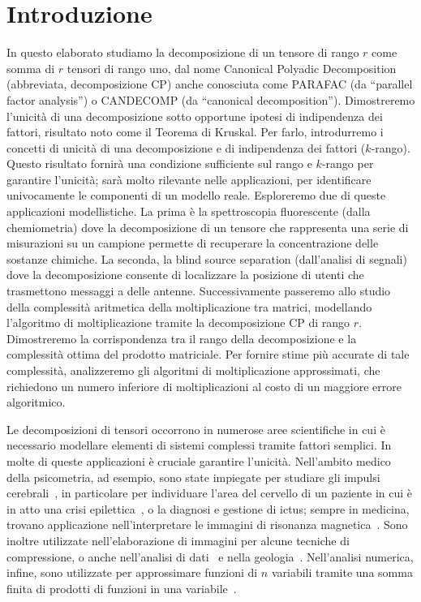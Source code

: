 
\chapter*{Introduzione}

In questo elaborato studiamo la decomposizione di un tensore di rango $ r $ come somma di $ r $ tensori di rango uno, dal
nome Canonical Polyadic Decomposition (abbreviata, decomposizione CP) anche conosciuta come PARAFAC (da ``parallel factor
analysis'') o CANDECOMP (da ``canonical decomposition'').
Dimostreremo l'unicità di una decomposizione sotto opportune ipotesi di indipendenza dei fattori, risultato noto come il Teorema
di Kruskal. Per farlo, introdurremo i concetti di unicità di una decomposizione e di indipendenza
dei fattori ($ k $-rango). Questo
risultato fornirà una condizione sufficiente sul rango e $k$-rango per garantire l'unicità; sarà molto rilevante nelle applicazioni, per identificare univocamente le componenti di un
modello reale. Esploreremo due di queste applicazioni modellistiche. La prima è la spettroscopia fluorescente (dalla
chemiometria) dove la decomposizione di un tensore che rappresenta una serie di misurazioni su un
campione permette di recuperare la concentrazione delle sostanze chimiche. La seconda, la blind
source separation (dall'analisi di segnali) dove la decomposizione consente di localizzare la posizione
di utenti che trasmettono messaggi a delle antenne.
Successivamente passeremo allo studio della complessità aritmetica della
moltiplicazione tra matrici, modellando l'algoritmo di moltiplicazione tramite la
decomposizione CP di rango $ r $. Dimostreremo la corrispondenza tra il rango della decomposizione e
la complessità ottima del prodotto matriciale. Per fornire stime più accurate di tale complessità,
analizzeremo gli algoritmi di moltiplicazione approssimati, che richiedono un numero inferiore di moltiplicazioni al
costo di un maggiore errore algoritmico.

Le decomposizioni di tensori occorrono in numerose aree scientifiche in cui è necessario modellare elementi di sistemi complessi
tramite fattori semplici. In molte di queste applicazioni è
cruciale garantire l'unicità. Nell'ambito medico della psicometria, ad esempio, sono state impiegate
per studiare gli impulsi cerebrali~\cite{tucker1963implications, harshman1996uniqueness, carroll1970analysis}, in particolare per individuare l'area del cervello di un paziente in cui è in atto una crisi
epilettica~\cite{calamante2004defining, schultz2008estimating}, o la diagnosi e gestione di ictus; sempre in medicina, trovano applicazione
nell'interpretare le immagini di risonanza magnetica~\cite{schultz2008estimating, calamante2004defining}. Sono inoltre utilizzate nell'elaborazione di immagini per alcune tecniche di
compressione, o anche nell'analisi di
dati~\cite{li2008discriminant, astrid2017cp} e nella geologia~\cite{mcneice2001multisite}. Nell'analisi numerica, infine,
sono utilizzate per approssimare funzioni di $ n $
variabili tramite una somma finita di prodotti di funzioni in una variabile~\cite{hackbusch2008tensor}.

